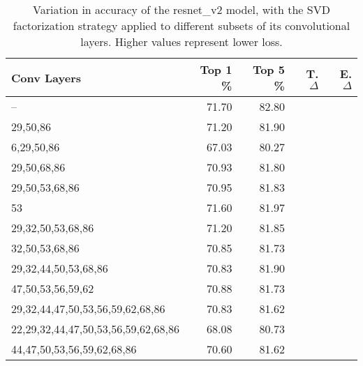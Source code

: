 \begin{table}
\centering
\begin{tabular}{|l|r|r|r|r|}
\hline
Conv Layers & Top 1 \% & Top 5 \% & T. $\Delta$ & E. $\Delta$ \\\hline
-- & 71.70 & 82.80 &  & \\\hline
29,50,86 & 71.20 & 81.90 &  &  \\\hline
6,29,50,86 & 67.03 & 80.27 &  &  \\\hline
29,50,68,86 & 70.93 & 81.80 &  &  \\\hline
29,50,53,68,86 & 70.95 & 81.83 &  &  \\\hline
53 & 71.60 & 81.97 &  & \\\hline
29,32,50,53,68,86 & 71.20 & 81.85 &  &  \\\hline
32,50,53,68,86 & 70.85 & 81.73 &  &  \\\hline
29,32,44,50,53,68,86 & 70.83 & 81.90 &  &  \\\hline
47,50,53,56,59,62 & 70.88 & 81.73 &  &  \\\hline
29,32,44,47,50,53,56,59,62,68,86 & 70.83 & 81.62 &  &  \\\hline
22,29,32,44,47,50,53,56,59,62,68,86 & 68.08 & 80.73 &  &  \\\hline
44,47,50,53,56,59,62,68,86 & 70.60 & 81.62 &  &  \\\hline
\end{tabular}
\caption{Variation in accuracy of the resnet\_v2 model, with the SVD factorization strategy applied to different subsets of its convolutional layers. Higher values represent lower loss.}
\label{resnet_v2-accuracy}
\end{table}
